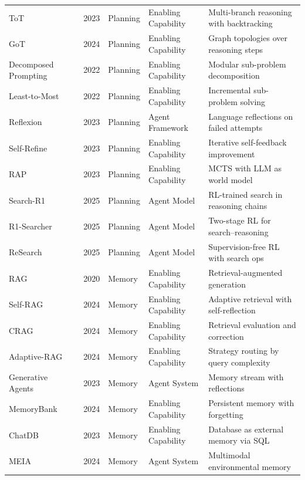 \begin{table}[htbp]
{\begin{tabular}{@{} l l l l l @{}}
ToT~\cite{yao2023tree} & 2023 & Planning & Enabling Capability & Multi-branch reasoning with backtracking \\
GoT~\cite{besta2024graph} & 2024 & Planning & Enabling Capability & Graph topologies over reasoning steps \\
Decomposed Prompting~\cite{khot2022decomposed} & 2022 & Planning & Enabling Capability & Modular sub-problem decomposition \\
Least-to-Most~\cite{zhou2022least} & 2022 & Planning & Enabling Capability & Incremental sub-problem solving \\
Reflexion~\cite{shinn2023reflexion} & 2023 & Planning & Agent Framework & Language reflections on failed attempts \\
Self-Refine~\cite{madaan2023selfrefine} & 2023 & Planning & Enabling Capability & Iterative self-feedback improvement \\
RAP~\cite{hao2023reasoning} & 2023 & Planning & Enabling Capability & MCTS with LLM as world model \\
Search-R1~\cite{jin2025search} & 2025 & Planning & Agent Model & RL-trained search in reasoning chains \\
R1-Searcher~\cite{song2025r1} & 2025 & Planning & Agent Model & Two-stage RL for search--reasoning \\
ReSearch~\cite{chen2503research} & 2025 & Planning & Agent Model & Supervision-free RL with search ops \\
RAG~\cite{lewis2020retrieval} & 2020 & Memory & Enabling Capability & Retrieval-augmented generation \\
Self-RAG~\cite{asai2024self} & 2024 & Memory & Enabling Capability & Adaptive retrieval with self-reflection \\
CRAG~\cite{yan2024corrective} & 2024 & Memory & Enabling Capability & Retrieval evaluation and correction \\
Adaptive-RAG~\cite{jeong2024adaptive} & 2024 & Memory & Enabling Capability & Strategy routing by query complexity \\
Generative Agents~\cite{park2023generative} & 2023 & Memory & Agent System & Memory stream with reflections \\
MemoryBank~\cite{zhong2024memorybank} & 2024 & Memory & Enabling Capability & Persistent memory with forgetting \\
ChatDB~\cite{hu2023chatdb} & 2023 & Memory & Enabling Capability & Database as external memory via SQL \\
MEIA~\cite{liu2024meia} & 2024 & Memory & Agent System & Multimodal environmental memory \\

\end{tabular}}
\end{table}
